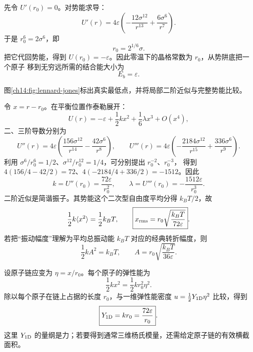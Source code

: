 {\begin{xesolution}
先令 $U'(r_0)=0$。对势能求导：
\begin{equation}
  U'(r)=4\varepsilon\left(-\frac{12\sigma^{12}}{r^{13}}
  +\frac{6\sigma^6}{r^7}\right).
\end{equation}
于是 $r_0^6=2\sigma^6$，即
\begin{equation}
  \boxed{r_0=2^{1/6}\sigma}.
\end{equation}
把它代回势能，得到 $U(r_0)=-\varepsilon$。因此零温下的晶格常数为 $r_0$，从势阱底把一个原子
移到无穷远所需的结合能大小为
\begin{equation}
  \boxed{E_b=\varepsilon}.
\end{equation}

图\ref{ch14:fig:lennard-jones}标出真实最低点，并将局部二阶近似与完整势能比较。
\lennardJonesDiagram

令 $x=r-r_0$。在平衡位置作泰勒展开：
\begin{equation}
  U(r)=-\varepsilon+\frac12kx^2+\frac16\lambda x^3+O(x^4),
\end{equation}
二、三阶导数分别为
\[
 U''(r)=4\varepsilon\left(\frac{156\sigma^{12}}{r^{14}}-\frac{42\sigma^6}{r^8}\right),\qquad
 U'''(r)=4\varepsilon\left(-\frac{2184\sigma^{12}}{r^{15}}+\frac{336\sigma^6}{r^9}\right).
\]
利用 $\sigma^6/r_0^6=1/2$、$\sigma^{12}/r_0^{12}=1/4$，可分别提出 $r_0^{-2}$、$r_0^{-3}$，
得到 $4(156/4-42/2)=72$、$4(-2184/4+336/2)=-1512$。因此
\begin{equation}
  \boxed{k=U''(r_0)=\frac{72\varepsilon}{r_0^2}},
  \qquad
  \boxed{\lambda=U'''(r_0)=-\frac{1512\varepsilon}{r_0^3}}.
\end{equation}
二阶近似是简谐振子。其势能这个二次型自由度平均分得 $k_BT/2$，故
\begin{equation}
  \frac12k\langle x^2\rangle=\frac12k_BT,
  \qquad
  \boxed{x_{\rm rms}=r_0\sqrt{\frac{k_BT}{72\varepsilon}}}.
\end{equation}
若把“振动幅度”理解为平均总振动能 $k_BT$ 对应的经典转折幅度，则
\begin{equation}
  \frac12kA^2=k_BT,\qquad
  \boxed{A=r_0\sqrt{\frac{k_BT}{36\varepsilon}}}.
\end{equation}

设原子链应变为 $\eta=x/r_0$。每个原子的弹性能为
\begin{equation}
  \frac12kx^2=\frac12kr_0^2\eta^2.
\end{equation}
除以每个原子在链上占据的长度 $r_0$，与一维弹性能密度
$u=\tfrac12Y_{1\rm D}\eta^2$ 比较，得到
\begin{equation}
  \boxed{Y_{1\rm D}=kr_0=\frac{72\varepsilon}{r_0}}.
\end{equation}
这里 $Y_{1\rm D}$ 的量纲是力；若要得到通常三维杨氏模量，还需给定原子链的有效横截面积。


\end{xesolution}}
